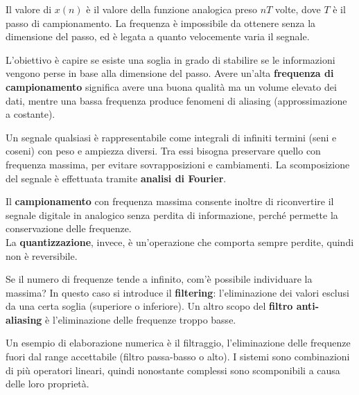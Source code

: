 Il valore di $x(n)$ è il valore della funzione analogica preso $nT$ volte, dove $T$ è il passo di campionamento. La frequenza è impossibile da ottenere senza la dimensione del passo, ed è legata a quanto velocemente varia il segnale. 

L'obiettivo è capire se esiste una soglia in grado di stabilire se le informazioni vengono perse in base alla dimensione del passo. Avere un'alta \textbf{frequenza di campionamento} significa avere una buona qualità ma un volume elevato dei dati, mentre una bassa frequenza produce fenomeni di aliasing (approssimazione a costante).

Un segnale qualsiasi è rappresentabile come integrali di infiniti termini (seni e coseni) con peso e ampiezza diversi. Tra essi bisogna preservare quello con frequenza massima, per evitare sovrapposizioni e cambiamenti. La scomposizione del segnale è effettuata tramite \textbf{analisi di Fourier}. 

Il \textbf{campionamento} con frequenza massima consente inoltre di riconvertire il segnale digitale in analogico senza perdita di informazione, perché permette la conservazione delle frequenze. \\
La \textbf{quantizzazione}, invece, è un'operazione che comporta sempre perdite, quindi non è reversibile. 

Se il numero di frequenze tende a infinito, com'è possibile individuare la massima? In questo caso si introduce il \textbf{filtering}: l'eliminazione dei valori esclusi da una certa soglia (superiore o inferiore). Un altro scopo del \textbf{filtro anti-aliasing} è l'eliminazione delle frequenze troppo basse.

Un esempio di elaborazione numerica è il filtraggio, l'eliminazione delle frequenze fuori dal range accettabile (filtro passa-basso o alto). I sistemi sono combinazioni di più operatori lineari, quindi nonostante complessi sono scomponibili a causa delle loro proprietà.
